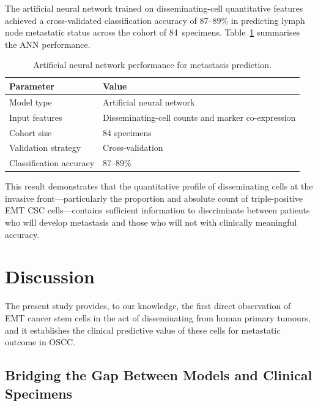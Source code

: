 \documentclass[11pt,a4paper]{article}
\begin{document}
The artificial neural network trained on disseminating-cell quantitative features achieved a cross-validated classification accuracy of 87--89\% in predicting lymph node metastatic status across the cohort of 84~specimens. Table~\ref{tab:ann} summarises the ANN performance.

\begin{table}[ht]
\centering
\caption{Artificial neural network performance for metastasis prediction.}
\label{tab:ann}
\begin{tabular}{@{}ll@{}}
\toprule
Parameter & Value \\
\midrule
Model type & Artificial neural network \\
Input features & Disseminating-cell counts and marker co-expression \\
Cohort size & 84 specimens \\
Validation strategy & Cross-validation \\
Classification accuracy & 87--89\% \\
\bottomrule
\end{tabular}
\end{table}

This result demonstrates that the quantitative profile of disseminating cells at the invasive front---particularly the proportion and absolute count of triple-positive EMT CSC cells---contains sufficient information to discriminate between patients who will develop metastasis and those who will not with clinically meaningful accuracy.

\section{Discussion}

The present study provides, to our knowledge, the first direct observation of EMT cancer stem cells in the act of disseminating from human primary tumours, and it establishes the clinical predictive value of these cells for metastatic outcome in OSCC.

\subsection{Bridging the Gap Between Models and Clinical Specimens}
\end{document}

